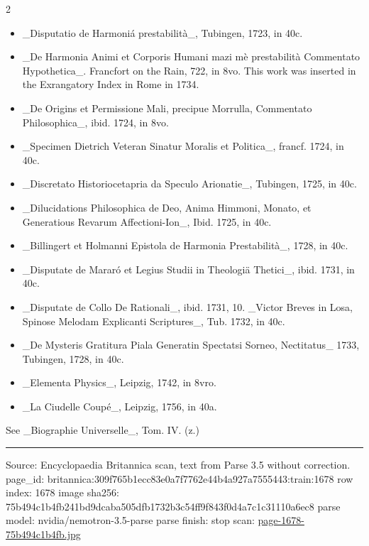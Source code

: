 \documentclass[10pt]{article}
\begin{document}
\begin{multicols}{2}
\begin{itemize}\setlength{\itemsep}{1pt}
\item \_Disputatio de Harmoniá prestabilità\_, Tubingen, 1723, in 40c.
\item \_De Harmonia Animi et Corporis Humani mazi mè prestabilità Commentato Hypothetica\_. Francfort on the Rain, 722, in 8vo. This work was inserted in the Exrangatory Index in Rome in 1734.
\item \_De Origins et Permissione Mali, precipue Morrulla, Commentato Philosophica\_, ibid. 1724, in 8vo.
\item \_Specimen Dietrich Veteran Sinatur Moralis et Politica\_, francf. 1724, in 40c.
\item \_Discretato Historiocetapria da Speculo Arionatie\_, Tubingen, 1725, in 40c.
\item \_Dilucidations Philosophica de Deo, Anima Himmoni, Monato, et Generatious Revarum Affectioni-Ion\_, Ibid. 1725, in 40c.
\item \_Billingert et Holmanni Epistola de Harmonia Prestabilità\_, 1728, in 40c.
\item \_Disputate de Mararó et Legius Studii in Theologiä Thetici\_, ibid. 1731, in 40c.
\item \_Disputate de Collo De Rationali\_, ibid. 1731, 10. \_Victor Breves in Losa, Spinose Melodam Explicanti Scriptures\_, Tub. 1732, in 40c.
\item \_De Mysteris Gratitura Piala Generatin Spectatsi Sorneo, Nectitatus\_ 1733, Tubingen, 1728, in 40c.
\item \_Elementa Physics\_, Leipzig, 1742, in 8vro.
\item \_La Ciudelle Coupé\_, Leipzig, 1756, in 40a.
\end{itemize}
See \_Biographie Universelle\_, Tom. IV. (z.)

\end{multicols}
\vfill\par\noindent\rule{\linewidth}{0.4pt}\par
{\scriptsize\color{gray}\noindent Source: Encyclopaedia Britannica scan, text from Parse 3.5 without correction. page\_id: britannica:309f765b1ecc83e0a7f7762e44b4a927a7555443:train:1678 \quad row index: 1678 \quad image sha256: 75b494c1b4fb241bd9dcaba505dfb1732b3c54ff9f843f0d4a7c1c31110a6ec8 \quad parse model: nvidia/nemotron-3.5-parse \quad parse finish: stop \quad scan: \href{../scans/page-1678-75b494c1b4fb.jpg}{page-1678-75b494c1b4fb.jpg}\par}
\end{document}
